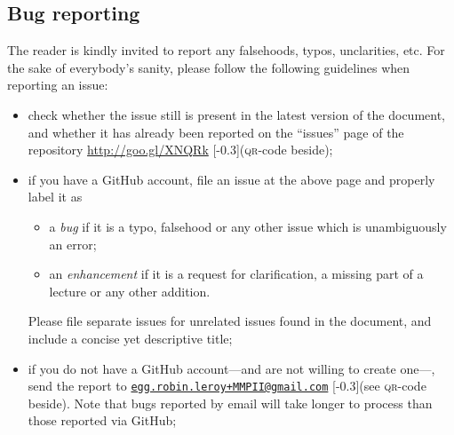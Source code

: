 \documentclass[10pt, a4paper, twoside]{lecturenotes}
\begin{document}
\subsection*{Bug reporting}
The reader is kindly invited to report any falsehoods, typos, unclarities, etc. For the sake of everybody's sanity, please follow the following guidelines when reporting an issue:
\begin{itemize}
\item check whether the issue still is present in the latest version of the document, and whether it has already been reported on the ``issues'' page of the repository \url{http://goo.gl/XNQRk} [-0.3\marginparwidth](\textsc{qr}-code beside);
\item if you have a GitHub account, file an issue at the above page and properly label it as
\begin{itemize}
\item a \emph{bug} if it is a typo, falsehood or any other issue which is unambiguously an error;
\item an \emph{enhancement} if it is a request for clarification, a missing part of a lecture or any other addition.
\end{itemize}
Please file separate issues for unrelated issues found in the document, and include a concise yet descriptive title;
\item if you do not have a GitHub account---and are not willing to create one---, send the report to \hyperref{mailto:egg.robin.leroy+MMPII@gmail.com}{}{}{\nolinkurl{egg.robin.leroy+MMPII@gmail.com}} [-0.3\marginparwidth](see \textsc{qr}-code beside). Note that bugs reported by email will take longer to process than those reported via GitHub;

\end{itemize}
\end{document}
